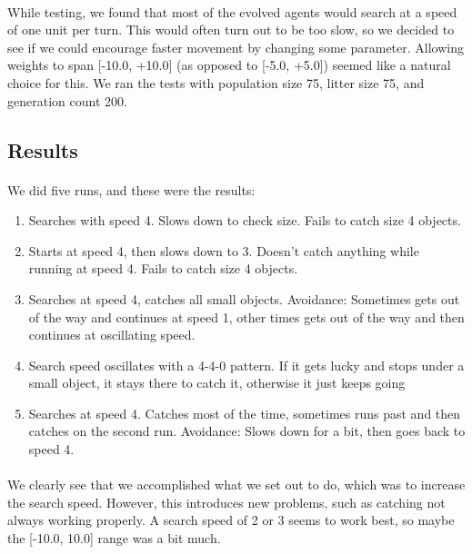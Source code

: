 \documentclass[a4paper,12pt]{article}
\begin{document}
\paragraph{}While testing, we found that most of the evolved agents would search at a speed of one unit per turn. This would often turn out to be too slow, so we decided to see if we could encourage faster movement by changing some parameter. Allowing weights to span [-10.0, +10.0] (as opposed to [-5.0, +5.0]) seemed like a natural choice for this. We ran the tests with population size 75, litter size 75, and generation count 200.
\subsection{Results}
\paragraph{}We did five runs, and these were the results:
\begin{enumerate}
\item{Searches with speed 4. Slows down to check size. Fails to catch size 4 objects.}
\item{Starts at speed 4, then slows down to 3. Doesn't catch anything while running at speed 4. Fails to catch size 4 objects.}
\item{Searches at speed 4, catches all small objects. Avoidance: Sometimes gets out of the way and continues at speed 1, other times gets out of the way and then continues at oscillating speed.}
\item{Search speed oscillates with a 4-4-0 pattern. If it gets lucky and stops under a small object, it stays there to catch it, otherwise it just keeps going}
\item{Searches at speed 4. Catches most of the time, sometimes runs past and then catches on the second run. Avoidance: Slows down for a bit, then goes back to speed 4.}
\end{enumerate}
\paragraph{}We clearly see that we accomplished what we set out to do, which was to increase the search speed. However, this introduces new problems, such as catching not always working properly. A search speed of 2 or 3 seems to work best, so maybe the [-10.0, 10.0] range was a bit much.
\end{document}
